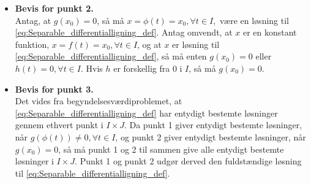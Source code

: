 \begin{bev}
\begin{itemize}
        Ud fra antagelserne om $G(x)$, findes der en invers funktion, $G^{-1}(x)$, så $x = \phi(t) = G^{-1}\left(H(t)\right)$. Da højresiden er differentiabel, er $\phi(t)$ også differentiabel på $I$. Ved at differentiere begge sider af $G(x)=H(t)+k$, med hensyn til $t$, og substituere $x=\phi(t)$ fås
       \begin{align*}
            G'\left(\phi(t)\right)\phi'(t) &= H'(t)\\
            &\Downarrow\\
            \frac{\phi'(t)}{g\left(\phi(t)\right)} &= h(t)\\
            &\Updownarrow\\
            \phi'(t) &= g\left(\phi(t)\right)h(t)
            \intertext{$x=\phi(t)$ substitueres ind i udtrykket.}
            \frac{dx}{dt}&= g(x)h(t)
       \end{align*} 
       Dermed er det bevist, at \eqref{eq:punkt_1_separable_differentialligninger_sætning} er en løsning til \eqref{eq:Separable_differentialligning_def}.
        
            
        \item[] \textbf{Bevis for punkt 2.}\\     
        Antag, at $g(x_0)=0$, så må $x=\phi(t)=x_0, \forall t\in I,$ være en løsning til \eqref{eq:Separable_differentialligning_def}. Antag omvendt, at $x$ er en konstant funktion, $x = f(t) = x_0, \forall t\in I$, og at $x$ er løsning til \eqref{eq:Separable_differentialligning_def}, så må enten $g(x_0)=0$ eller $h(t)=0, \forall t\in I$. Hvis $h$ er forskellig fra $0$ i $I$, så må $g(x_0)=0$.
            

        \item[] \textbf{Bevis for punkt 3.}\\ 
            Det vides fra begyndelsesværdiproblemet, at \eqref{eq:Separable_differentialligning_def} har entydigt bestemte løsninger gennem ethvert punkt i $I\times J$. Da punkt 1 giver entydigt bestemte løsninger, når $g\left(\phi(t)\right) \neq 0, \forall t\in I$, og punkt 2 giver entydigt bestemte løsninger, når $g(x_0)=0$, så må punkt 1 og 2 til sammen give alle entydigt bestemte løsninger i $I \times J$. Punkt 1 og punkt 2 udgør derved den fuldstændige løsning til \eqref{eq:Separable_differentialligning_def}.
    \end{itemize}
\end{bev}

